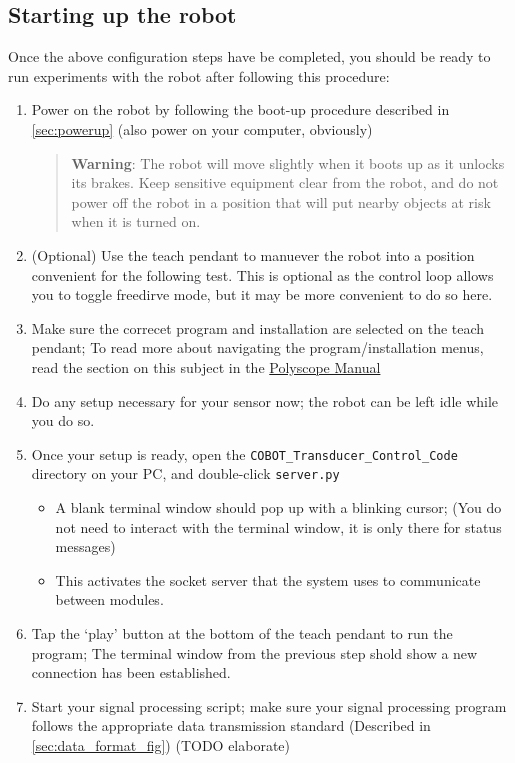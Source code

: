 \documentclass[11pt]{article}
\begin{document}
\subsection{Starting up the robot}
Once the above configuration steps have be completed, you should be ready to run experiments with the robot after following this procedure:
\begin{enumerate}
    \item Power on the robot by following the boot-up procedure described in \autoref{sec:powerup} (also power on your computer, obviously)
    \begin{quotation}
        \textbf{Warning}: The robot will move slightly when it boots up as it unlocks its brakes. Keep sensitive equipment clear from the robot, and do not power off the robot in a position that will put nearby objects at risk when it is turned on.
    \end{quotation}
    \item (Optional) Use the teach pendant to manuever the robot into a position convenient for the following test. This is optional as the control loop allows you to toggle freedirve mode, but it may be more convenient to do so here.
    \item Make sure the correcet program and installation are selected on the teach pendant; To read more about navigating the program/installation menus, read the section on this subject in the \hyperlink{https://s3-eu-west-1.amazonaws.com/ur-support-site/44018/Software_Manual_en_Global.pdf\#page=103}{Polyscope Manual}
    \item Do any setup necessary for your sensor now; the robot can be left idle while you do so.
    \item Once your setup is ready, open the \texttt{COBOT\_Transducer\_Control\_Code} directory on your PC, and double-click \texttt{server.py}
    \begin{itemize}
        \item A blank terminal window should pop up with a blinking cursor; (You do not need to interact with the terminal window, it is only there for status messages)
        \item This activates the socket server that the system uses to communicate between modules.
    \end{itemize}
    \item Tap the `play' button at the bottom of the teach pendant to run the program; The terminal window from the previous step shold show a new connection has been established.
    \item Start your signal processing script; make sure your signal processing program follows the appropriate data transmission standard (Described in \autoref{sec:data_format_fig}) (TODO elaborate)

\end{enumerate}
\end{document}
